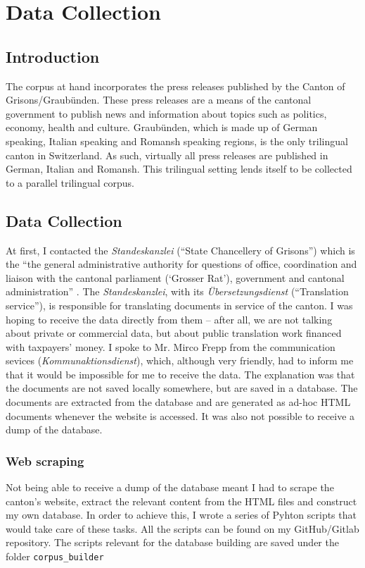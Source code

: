 \chapter{Data Collection}
\section{Introduction}

The corpus at hand incorporates the press releases published by the Canton of Grisons/Graubünden. 
These press releases are a means of the cantonal government to publish news and information about topics such as politics, economy, health and culture. 
Graubünden, which is made up of German speaking, Italian speaking and Romansh speaking regions, is the only trilingual canton in Switzerland. 
As such, virtually all press releases are published in German, Italian and Romansh. 
This trilingual setting lends itself to be collected to a parallel trilingual corpus.

\section{Data Collection}
At first, I contacted the \emph{Standeskanzlei} (\enquote{State Chancellery of Grisons}) which is the \enquote{the general administrative authority for questions of office, coordination and liaison with the cantonal parliament (\enquote{Grosser Rat}), government and cantonal administration} \autocite{staka}. 
The \emph{Standeskanzlei}, with its \emph{Übersetzungsdienst} (\enquote{Translation service}), is responsible for translating documents in service of the canton.
I was hoping to receive the data directly from them -- after all, we are not talking about private or commercial data, but about public translation work financed with taxpayers' money.
I spoke to Mr. Mirco Frepp from the communication sevices (\emph{Kommunaktionsdienst}), which, although very friendly, had to inform me that it would be impossible for me to receive the data. 
The explanation was that the documents are not saved locally somewhere, but are saved in a database. 
The documents are extracted from the database and are generated as ad-hoc HTML documents whenever the website is accessed. 
It was also not possible to receive a dump of the database.

\subsection{Web scraping}
Not being able to receive a dump of the database meant I had to scrape the canton's website, extract the relevant content from the HTML files and construct my own database. In order to achieve this, I wrote a series of Pyhton scripts that would take care of these tasks. 
All the scripts can be found on my GitHub/Gitlab repository. 
The scripts relevant for the database building are saved under the folder \texttt{corpus\_builder}

